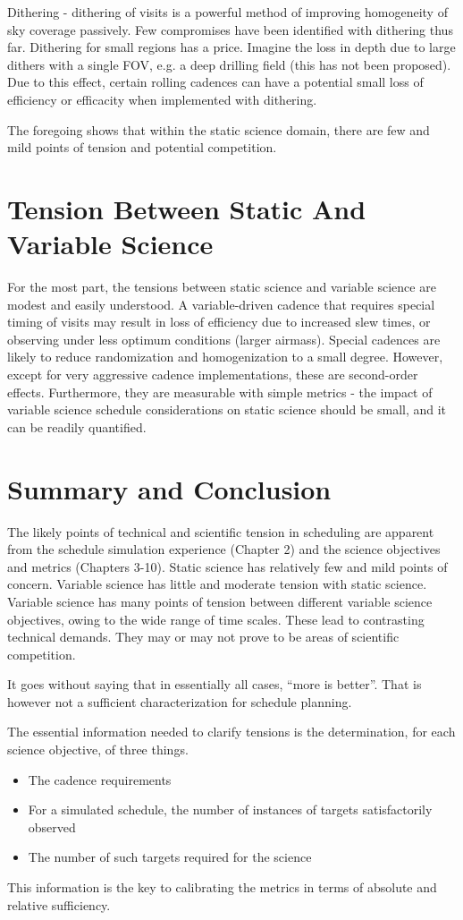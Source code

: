 Dithering - dithering of visits is a powerful method of improving homogeneity of sky coverage passively. Few compromises have been identified with dithering thus far.  Dithering for small regions has a price. Imagine the loss in depth due to large dithers with a single FOV, e.g. a deep drilling field (this has not been proposed).  Due to this effect, certain rolling cadences can have a potential small loss of efficiency or efficacity when implemented with dithering. 

The foregoing shows that within the static science domain, there are few and mild points of tension and potential competition.  

\section{Tension Between Static And Variable Science}

For the most part, the tensions between static science and variable science are modest and easily understood.  A variable-driven cadence that requires special timing of visits may result in loss of efficiency due to increased slew times, or observing under less optimum conditions (larger airmass).  Special cadences are likely to reduce randomization and homogenization to a small degree. However, except for very aggressive cadence implementations, these are second-order effects.  Furthermore, they are measurable with simple metrics - the impact of variable science schedule considerations on static science should be small, and it can be readily quantified.

\section{Summary and Conclusion}

The likely points of technical and scientific tension in scheduling are apparent from the schedule simulation experience (Chapter 2) and the science objectives and metrics (Chapters 3-10).  Static science has relatively few and mild points of concern.  Variable science has little and moderate tension with static science.  Variable science has many points of tension between different variable science objectives, owing to the wide range of time scales. These lead to contrasting technical demands.  They may or may not prove to be areas of scientific competition. 

It goes without saying that in essentially all cases, ``more is better''.  That is however not a sufficient characterization for schedule planning.

The essential information needed to clarify tensions is the determination, for each science objective, of three things.
\begin{itemize}
	\item The cadence requirements
	\item For a simulated schedule, the number of instances of targets satisfactorily observed
	\item The number of such targets required for the science
\end{itemize}
	
This information is the key to calibrating the metrics in terms of absolute and relative  sufficiency. 
